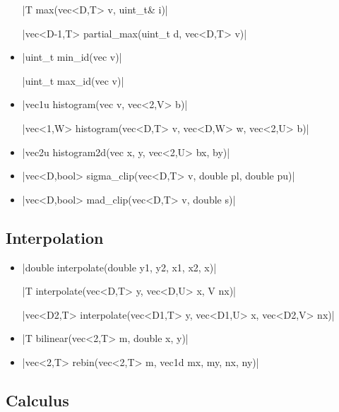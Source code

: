 \documentclass[12pt]{report}
\begin{document}
\begin{itemize}
\cppinline|T max(vec<D,T> v, uint_t& i)|

\cppinline|vec<D-1,T> partial_max(uint_t d, vec<D,T> v)| 

\item \cppinline|uint_t min_id(vec v)| 

\cppinline|uint_t max_id(vec v)| 

\item \cppinline|vec1u histogram(vec v, vec<2,V> b)| 

\cppinline|vec<1,W> histogram(vec<D,T> v, vec<D,W> w, vec<2,U> b)|

\item \cppinline|vec2u histogram2d(vec x, y, vec<2,U> bx, by)| 

\item \cppinline|vec<D,bool> sigma_clip(vec<D,T> v, double pl, double pu)| 

\item \cppinline|vec<D,bool> mad_clip(vec<D,T> v, double s)| 

\end{itemize}

\subsection{Interpolation}

\begin{itemize}
\item \cppinline|double interpolate(double y1, y2, x1, x2, x)| 

\cppinline|T interpolate(vec<D,T> y, vec<D,U> x, V nx)|

\cppinline|vec<D2,T> interpolate(vec<D1,T> y, vec<D1,U> x, vec<D2,V> nx)|

\item \cppinline|T bilinear(vec<2,T> m, double x, y)| 

\item \cppinline|vec<2,T> rebin(vec<2,T> m, vec1d mx, my, nx, ny)| 
\end{itemize}

\subsection{Calculus}
\end{document}
